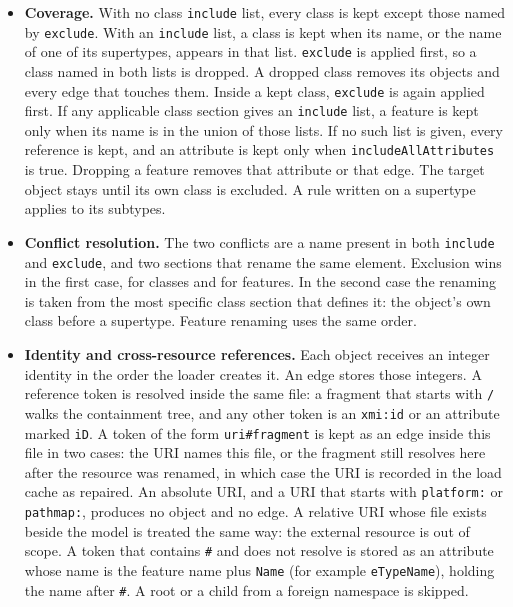 \documentclass[journal,article,submit,moreauthors,technologies]{Definitions/mdpi}
\newcommand{\rev}[1]{#1}
\begin{document}
\begin{itemize}
    \item \rev{\textbf{Coverage.} With no class \texttt{include} list, every class is kept except those named by \texttt{exclude}. With an \texttt{include} list, a class is kept when its name, or the name of one of its supertypes, appears in that list. \texttt{exclude} is applied first, so a class named in both lists is dropped. A dropped class removes its objects and every edge that touches them. Inside a kept class, \texttt{exclude} is again applied first. If any applicable class section gives an \texttt{include} list, a feature is kept only when its name is in the union of those lists. If no such list is given, every reference is kept, and an attribute is kept only when \texttt{includeAllAttributes} is true. Dropping a feature removes that attribute or that edge. The target object stays until its own class is excluded. A rule written on a supertype applies to its subtypes.}
    \item \rev{\textbf{Conflict resolution.} The two conflicts are a name present in both \texttt{include} and \texttt{exclude}, and two sections that rename the same element. Exclusion wins in the first case, for classes and for features. In the second case the renaming is taken from the most specific class section that defines it: the object's own class before a supertype. Feature renaming uses the same order.}
    \item \rev{\textbf{Identity and cross-resource references.} Each object receives an integer identity in the order the loader creates it. An edge stores those integers. A reference token is resolved inside the same file: a fragment that starts with \texttt{/} walks the containment tree, and any other token is an \texttt{xmi:id} or an attribute marked \texttt{iD}. A token of the form \texttt{uri\#fragment} is kept as an edge inside this file in two cases: the URI names this file, or the fragment still resolves here after the resource was renamed, in which case the URI is recorded in the load cache as repaired. An absolute URI, and a URI that starts with \texttt{platform:} or \texttt{pathmap:}, produces no object and no edge. A relative URI whose file exists beside the model is treated the same way: the external resource is out of scope. A token that contains \texttt{\#} and does not resolve is stored as an attribute whose name is the feature name plus \texttt{Name} (for example \texttt{eTypeName}), holding the name after \texttt{\#}. A root or a child from a foreign namespace is skipped.}

\end{itemize}
\end{document}
